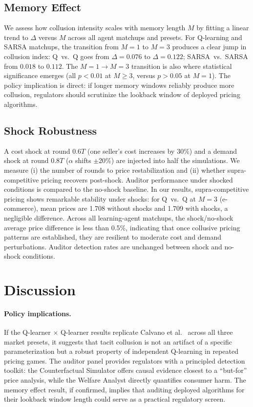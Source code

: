 \documentclass[11pt]{article}
\begin{document}
\subsection{Memory Effect}

We assess how collusion intensity scales with memory length $M$ by fitting a linear trend to $\Delta$ versus $M$ across all agent matchups and presets.
For Q-learning and SARSA matchups, the transition from $M = 1$ to $M = 3$ produces a clear jump in collusion index: Q~vs.~Q goes from $\Delta = 0.076$ to $\Delta = 0.122$; SARSA~vs.~SARSA from $0.018$ to $0.112$. The $M = 1 \to M = 3$ transition is also where statistical significance emerges (all $p < 0.01$ at $M \geq 3$, versus $p > 0.05$ at $M = 1$).
The policy implication is direct: if longer memory windows reliably produce more collusion, regulators should scrutinize the lookback window of deployed pricing algorithms.

\subsection{Shock Robustness}

A cost shock at round $0.6T$ (one seller's cost increases by 30\%) and a demand shock at round $0.8T$ ($\alpha$ shifts $\pm$20\%) are injected into half the simulations.
We measure (i) the number of rounds to price restabilization and (ii) whether supra-competitive pricing recovers post-shock.
Auditor performance under shocked conditions is compared to the no-shock baseline.
In our results, supra-competitive pricing shows remarkable stability under shocks: for Q~vs.~Q at $M = 3$ (e-commerce), mean prices are 1.708 without shocks and 1.709 with shocks, a negligible difference. Across all learning-agent matchups, the shock/no-shock average price difference is less than 0.5\%, indicating that once collusive pricing patterns are established, they are resilient to moderate cost and demand perturbations. Auditor detection rates are unchanged between shock and no-shock conditions.

\section{Discussion}

\paragraph{Policy implications.}
If the Q-learner $\times$ Q-learner results replicate Calvano et al.~\cite{calvano2020artificial} across all three market presets, it suggests that tacit collusion is not an artifact of a specific parameterization but a robust property of independent Q-learning in repeated pricing games.
The auditor panel provides regulators with a principled detection toolkit: the Counterfactual Simulator offers causal evidence closest to a ``but-for'' price analysis, while the Welfare Analyst directly quantifies consumer harm.
The memory effect result, if confirmed, implies that auditing deployed algorithms for their lookback window length could serve as a practical regulatory screen.
\end{document}
